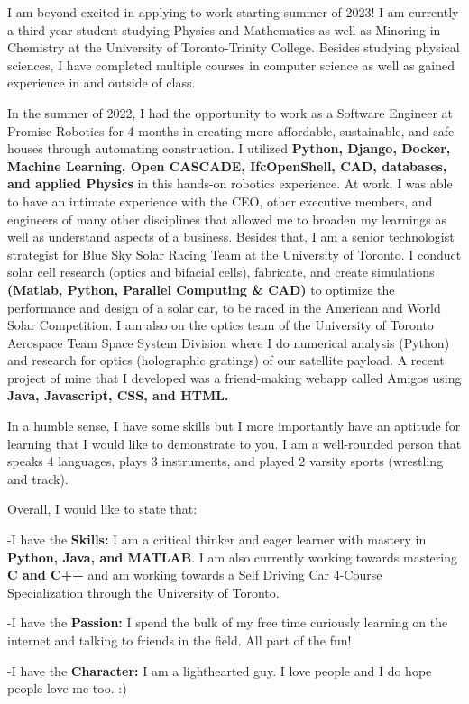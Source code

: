 \documentclass[11pt,a4]{article}
\newcommand{\bold}[1]{ {\bfseries #1}}
\begin{document}
I am beyond excited in applying to work starting summer of 2023! I am 
currently a third-year student studying Physics and Mathematics as well 
as Minoring in Chemistry at the University of Toronto-Trinity College.
Besides studying physical sciences, I have completed multiple courses 
in computer science as well as gained experience in and outside of class.
\par In the summer of 2022, I had the opportunity to work as a Software 
Engineer at Promise Robotics for 4 months in creating more affordable, 
sustainable, and safe houses through automating construction. I 
utilized \bold{Python, Django, Docker, Machine Learning, Open CASCADE,
IfcOpenShell, CAD, databases, and applied Physics} in this hands-on 
robotics experience. At work, I was able to have an intimate experience
with the CEO, other executive members, and engineers of many other 
disciplines that allowed me to broaden my learnings as well as understand 
aspects of a business. Besides that, I am a senior technologist strategist
for Blue Sky Solar Racing Team at the University of Toronto. I conduct
solar cell research (optics and bifacial cells), fabricate, and create
simulations \bold{(Matlab, Python, Parallel Computing \& CAD)} to 
optimize the performance and design of a solar car, to be raced in 
the American and World Solar Competition.  I am also on the optics 
team of the University of Toronto Aerospace Team Space System Division 
where I do numerical analysis (Python) and research for optics 
(holographic gratings) of our satellite payload. A recent project
of mine that I developed was a friend-making webapp called Amigos 
using \bold{Java, Javascript, CSS, and HTML.} \par In a humble sense,
I have some skills but I more importantly have an aptitude for 
learning that I would like to demonstrate to you. I am a well-rounded person that 
speaks 4 languages, plays 3 instruments, and played 2 varsity sports
 (wrestling and track). \par
Overall, I would like to state that:

-I have the \bold{Skills:} I am a critical thinker and eager learner with mastery in
\bold{Python, Java, and MATLAB}. I am also currently working towards mastering
\bold{C and C++} and am working towards a Self Driving Car 4-Course Specialization
through the University of Toronto.\par

-I have the \bold{Passion:} I spend the bulk of my free time curiously learning 
on the internet and talking to friends in the field. All part of the fun!\par
-I have the \bold{Character:} I am a lighthearted guy. I love people and I do 
hope people love me too. :)
\end{document}
